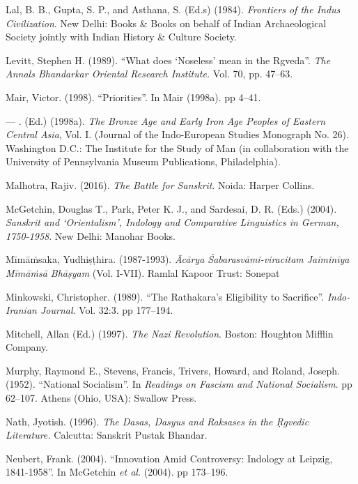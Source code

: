 \begin{thebibliography}{99}
  Lal, B. B., Gupta, S. P., and Asthana, S. (Ed.s) (1984).\textit{ Frontiers of the Indus Civilization}. New Delhi: Books \& Books on behalf of Indian Archaeological Society jointly with Indian History \& Culture Society.

  Levitt, Stephen H. (1989). “What does ‘Noseless’ mean in the Rgveda”. \textit{The Annals Bhandarkar Oriental Research Institute.} Vol. 70, pp. 47--63.

  Mair, Victor. (1998). “Priorities”. In Mair (1998a). pp 4--41.

  — . (Ed.) (1998a). \textit{The Bronze Age and Early Iron Age Peoples of Eastern Central Asia}, Vol. I. (Journal of the Indo-European Studies Monograph No. 26). Washington D.C.: The Institute for the Study of Man (in collaboration with the University of Pennsylvania Museum Publications, Philadelphia).

\newpage

  Malhotra, Rajiv. (2016). \textit{The Battle for Sanskrit}. Noida: Harper Collins.

  McGetchin, Douglas T., Park, Peter K. J., and Sardesai, D. R. (Eds.) (2004). \textit{Sanskrit and ‘Orientalism’, Indology and Comparative Linguistics in German, 1750-1958}. New Delhi: Manohar Books.

  Mīmāṁsaka, Yudhiṣṭhira. (1987-1993). \textit{Ācārya Śabarasvāmi-viracitam Jaiminīya Mīmāṁsā Bhāṣyam} (Vol. I-VII). Ramlal Kapoor Trust: Sonepat

  Minkowski, Christopher. (1989). “The Rathakara’s Eligibility to Sacrifice”. \textit{Indo-Iranian Journal}. Vol. 32:3. pp 177--194.

  Mitchell, Allan (Ed.) (1997). \textit{The Nazi Revolution}. Boston: Houghton Mifflin Company.

  Murphy, Raymond E., Stevens, Francis, Trivers, Howard, and Roland, Joseph. (1952). “National Socialism”. In \textit{Readings on Fascism and National Socialism}. pp 62--107. Athens (Ohio, USA): Swallow Press.

  Nath, Jyotish. (1996). \textit{The Dasas, Dasyus and Raksases in the Ṛgvedic Literature.} Calcutta: Sanskrit Pustak Bhandar.

  Neubert, Frank. (2004). “Innovation Amid Controversy: Indology at Leipzig, 1841-1958”. In McGetchin \textit{et al.} (2004). pp 173--196.


\end{thebibliography}
